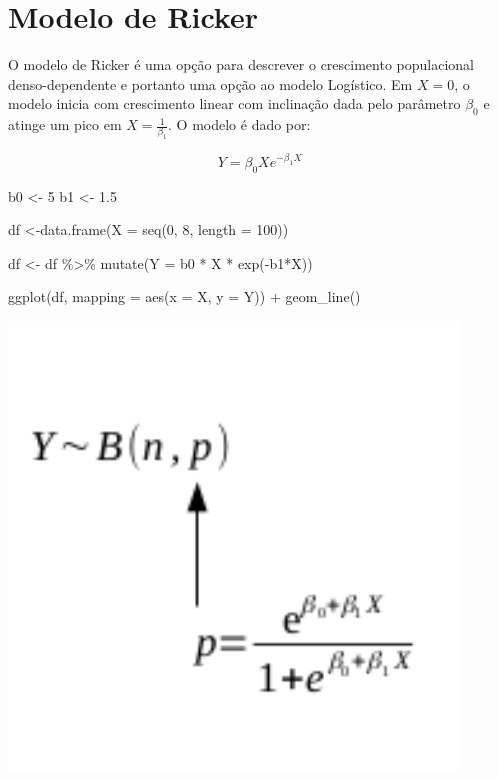 \documentclass[
]{book}
\newenvironment{Shaded}{\begin{snugshade}}{\end{snugshade}}
\newcommand{\AttributeTok}[1]{\textcolor[rgb]{0.77,0.63,0.00}{#1}}
\newcommand{\DecValTok}[1]{\textcolor[rgb]{0.00,0.00,0.81}{#1}}
\newcommand{\FloatTok}[1]{\textcolor[rgb]{0.00,0.00,0.81}{#1}}
\newcommand{\FunctionTok}[1]{\textcolor[rgb]{0.00,0.00,0.00}{#1}}
\newcommand{\NormalTok}[1]{#1}
\newcommand{\OtherTok}[1]{\textcolor[rgb]{0.56,0.35,0.01}{#1}}
\newcommand{\SpecialCharTok}[1]{\textcolor[rgb]{0.00,0.00,0.00}{#1}}
\begin{document}
\hypertarget{modelo-de-ricker}{%
\section{Modelo de Ricker}\label{modelo-de-ricker}}

O modelo de Ricker é uma opção para descrever o crescimento populacional denso-dependente e portanto uma opção ao modelo Logístico. Em \(X = 0\), o modelo inicia com crescimento linear com inclinação dada pelo parâmetro \(\beta_0\) e atinge um pico em \(X = \frac{1}{\beta_1}\). O modelo é dado por:

\[Y = \beta_0 X e^{-\beta_1 X}\]

\begin{Shaded}
\begin{Highlighting}[]
\NormalTok{b0 }\OtherTok{\textless{}{-}} \DecValTok{5}
\NormalTok{b1 }\OtherTok{\textless{}{-}} \FloatTok{1.5}

\NormalTok{df }\OtherTok{\textless{}{-}}\FunctionTok{data.frame}\NormalTok{(}\AttributeTok{X =} \FunctionTok{seq}\NormalTok{(}\DecValTok{0}\NormalTok{, }\DecValTok{8}\NormalTok{, }\AttributeTok{length =} \DecValTok{100}\NormalTok{))}

\NormalTok{df }\OtherTok{\textless{}{-}}\NormalTok{ df }\SpecialCharTok{\%\textgreater{}\%} \FunctionTok{mutate}\NormalTok{(}\AttributeTok{Y =}\NormalTok{ b0 }\SpecialCharTok{*}\NormalTok{ X }\SpecialCharTok{*} \FunctionTok{exp}\NormalTok{(}\SpecialCharTok{{-}}\NormalTok{b1}\SpecialCharTok{*}\NormalTok{X))}

\FunctionTok{ggplot}\NormalTok{(df, }\AttributeTok{mapping =} \FunctionTok{aes}\NormalTok{(}\AttributeTok{x =}\NormalTok{ X, }\AttributeTok{y =}\NormalTok{ Y)) }\SpecialCharTok{+}
  \FunctionTok{geom\_line}\NormalTok{()}
\end{Highlighting}
\end{Shaded}

\begin{center}\includegraphics{probest-cambientais_files/figure-latex/unnamed-chunk-232-1} \end{center}
\end{document}
